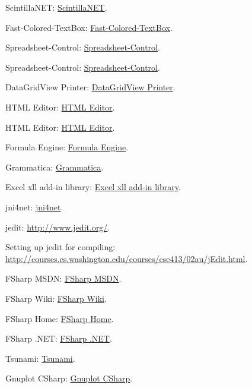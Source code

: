 	ScintillaNET: \href{http://scintillanet.codeplex.com/}{ScintillaNET}.
	
	
	
	
	Fast-Colored-TextBox: \href{http://www.codeproject.com/Articles/161871/Fast-Colored-TextBox-for-syntax-highlighting}{Fast-Colored-TextBox}.
	
	Spreadsheet-Control: \href{http://www.codeproject.com/Articles/691749/Free-NET-Spreadsheet-Control}{Spreadsheet-Control}.
	
	Spreadsheet-Control: \href{http://reogrid.net/download/}{Spreadsheet-Control}.
	
	
	DataGridView Printer: \href{http://www.codeproject.com/Articles/18042/Another-DataGridView-Printer?}{DataGridView Printer}.
	
	HTML Editor: \href{http://www.codeproject.com/Articles/15559/A-Windows-Forms-based-text-editor-with-HTML-output}{HTML Editor}.
	
	HTML Editor: \href{http://www.bitroom.de/csharp_htmleditor.php}{HTML Editor}.
	
	Formula Engine: \href{http://www.codeproject.com/Articles/17853/Implementing-an-Excel-like-formula-engine}{Formula Engine}.
	
	Grammatica: \href{http://grammatica.percederberg.net/}{Grammatica}.
	
	Excel xll add-in library: \href{http://xll.codeplex.com/}{Excel xll add-in library}.
	
	jni4net: \href{http://jni4net.com/}{jni4net}.
	
	jedit: \href{http://www.jedit.org/}{http://www.jedit.org/}.
	
	Setting up jedit for compiling: \href{http://courses.cs.washington.edu/courses/cse413/02au/jEdit.html}{http://courses.cs.washington.edu/courses/cse413/02au/jEdit.html}.
	
	
	
	FSharp MSDN: \href{http://msdn.microsoft.com/en-US/library/vstudio/ee241127(v=vs.120).aspx}{FSharp MSDN}.
	
	FSharp Wiki: \href{http://en.wikipedia.org/wiki/F_Sharp_(programming_language)}{FSharp Wiki}.
	
	FSharp Home: \href{http://fsharp.org/}{FSharp Home}.
	
	FSharp .NET: \href{http://fsharpforfunandprofit.com/posts/completeness-seamless-dotnet-interop/}{FSharp .NET}.
	
	Tsunami: \href{http://tsunami.io/index.html}{Tsunami}.
	
	Gnuplot CSharp: \href{https://github.com/AwokeKnowing/GnuplotCSharp}{Gnuplot CSharp}.
	
